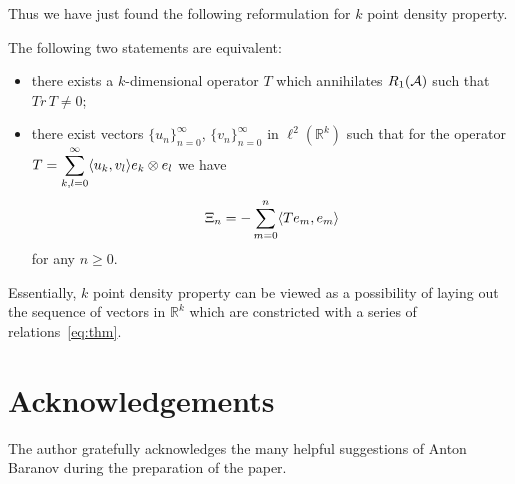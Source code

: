 \documentclass[12pt]{amsart}
\theoremstyle{case}
\begin{document}
  Thus we have just found the following reformulation for $k$ point density property.
  \begin{prop}
    \label{prop:kreformulation}
    The following two statements are equivalent:
    \begin{itemize}
      \item there exists a $k$-dimensional operator $T$ which annihilates $R_1(\cal{A})$
        such that $Tr\, T \neq 0$;
      \item there exist vectors $\{u_n\}_{n=0}^\infty$, $\{v_n\}_{n=0}^\infty$ in $\ell^2(\mathbb{R}^k)$ such that
        for the operator $T = \displaystyle\sum_{k,l=0}^\infty \inner{u_k}{v_l} e_k \otimes e_l$ we have
        \begin{equation}
          \label{eq:thm}
          \Xi_n = -\sum_{m=0}^n \inner{Te_m}{e_m}
        \end{equation}
          for any $n \geq 0$.
    \end{itemize}
  \end{prop}
  Essentially, $k$ point density property can be viewed as a
    possibility of laying out the sequence of vectors in $\mathbb{R}^k$ which are constricted with
    a series of relations~\eqref{eq:thm}.



\section{Acknowledgements}
  The author gratefully acknowledges the many helpful suggestions of Anton Baranov during the preparation of the paper.


\end{document}
